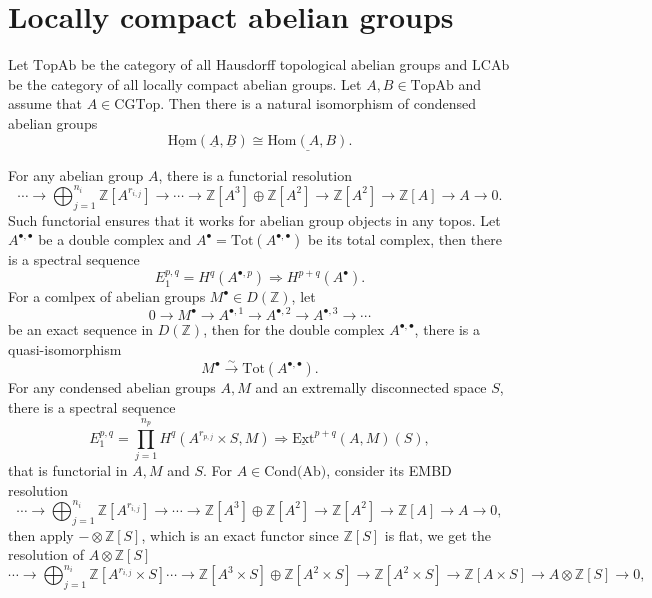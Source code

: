 \documentclass[UTF8,12,a4paper]{ctexart}
\theoremstyle{definition}
\begin{document}
\newpage
\section{Locally compact abelian groups}
\ntt Let $\text{TopAb}$ be the category of all Hausdorff topological abelian groups and $\text{LCAb}$ be the category of all locally compact abelian groups.
\prop
Let $A, B\in \text{TopAb}$  and assume that $A\in\text{CGTop}$. Then there is a natural isomorphism of condensed abelian groups
$$
\underline{\text{Hom}}(\underline{A},\underline{B})\cong \underline{\text{Hom}(A,B)}.
$$  




For any abelian group $A$, there is a functorial resolution
$$
\cdots\longrightarrow\bigoplus_{j=1}^{n_i}\mathbb{Z}[A^{r_{i,j}}]\longrightarrow\cdots\longrightarrow\mathbb{Z}[A^3]\oplus\mathbb{Z}[A^2]\longrightarrow\mathbb{Z}[A^2]\longrightarrow\mathbb{Z}[A]\longrightarrow A\to 0.
$$
\rem 
Such functorial ensures that it works for abelian group objects in any topos.
\lem\label{double} 
Let $A^{\bullet,\bullet}$ be a double complex and $A^\bullet=\text{Tot}(A^{\bullet,\bullet})$ be its total complex, then there is a spectral sequence
$$
E_1^{p,q}=H^q(A^{\bullet,p})\Longrightarrow H^{p+q}(A^\bullet).
$$
\lem \label{qis}
For a comlpex of abelian groups $M^\bullet\in D(\mathbb{Z})$, let 
$$
0\longrightarrow M^\bullet\longrightarrow A^{\bullet,1}\longrightarrow A^{\bullet,2}\longrightarrow A^{\bullet,3}\longrightarrow\cdots 
$$
be an exact sequence in $D(\mathbb{Z})$, then for the double complex $A^{\bullet,\bullet}$, there is a quasi-isomorphism
$$
M^\bullet\stackrel{\sim}{\rightarrow}\text{Tot}(A^{\bullet,\bullet}).
$$
\cor 
For any condensed abelian groups $A,M$ and an extremally disconnected space $S$, there is a spectral sequence
$$
E_1^{p,q}=\prod_{j=1}^{n_p} H^q(A^{r_{p,j}}\times S,M)\Longrightarrow \underline{\text{Ext}}^{p+q}(A,M)(S),
$$
that is functorial in $A, M$ and $S$.
\pf 
For $A\in \text{Cond(Ab)}$, consider its EMBD resolution
$$
\cdots\longrightarrow\bigoplus_{j=1}^{n_i}\mathbb{Z}[A^{r_{i,j}}]\longrightarrow\cdots\longrightarrow\mathbb{Z}[A^3]\oplus\mathbb{Z}[A^2]\longrightarrow\mathbb{Z}[A^2]\longrightarrow\mathbb{Z}[A]\longrightarrow A\to 0,
$$
then apply $-\otimes \mathbb{Z}[S]$, which is an exact functor since $\mathbb{Z}[S]$ is flat, we get the resolution of $A\otimes \mathbb{Z}[S]$
$$
\cdots\longrightarrow\bigoplus_{j=1}^{n_i}\mathbb{Z}[A^{r_{i,j}}\times S]\cdots\longrightarrow\mathbb{Z}[A^3\times S]\oplus\mathbb{Z}[A^2\times S]\longrightarrow\mathbb{Z}[A^2\times S]\longrightarrow\mathbb{Z}[A\times S]\longrightarrow A\otimes \mathbb{Z}[S]\to 0,
$$
\end{document}
